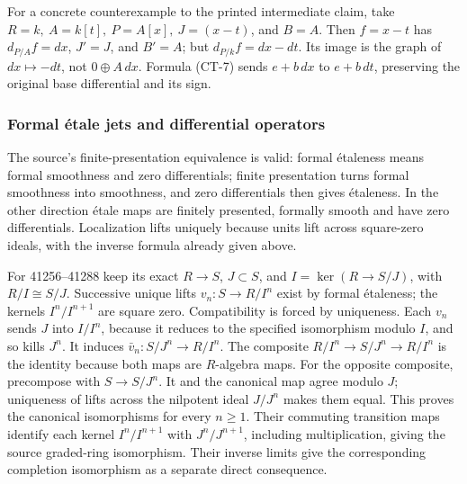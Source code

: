 For a concrete counterexample to the printed intermediate claim, take \(R=k,\ A=k[t],\ P=A[x],\ J=(x-t)\), and \(B=A\). Then \(f=x-t\) has \(d_{P/A}f=dx\), \(J'=J\), and \(B'=A\); but \(d_{P/k}f=dx-dt\). Its image is the graph of \(dx\mapsto-dt\), not \(0\oplus A\,dx\). Formula (CT-7) sends \(e+b\,dx\) to \(e+b\,dt\), preserving the original base differential and its sign.

\subsubsection{Formal étale jets and differential operators}\label{algebra-proof-055-formal-uxe9tale-jets-and-differential-operators}

The source's finite-presentation equivalence is valid: formal étaleness means formal smoothness and zero differentials; finite presentation turns formal smoothness into smoothness, and zero differentials then gives étaleness. In the other direction étale maps are finitely presented, formally smooth and have zero differentials. Localization lifts uniquely because units lift across square-zero ideals, with the inverse formula already given above.

For 41256--41288 keep its exact \(R\to S\), \(J\subset S\), and \(I=\ker(R\to S/J)\), with \(R/I\cong S/J\). Successive unique lifts \(v_n:S\to R/I^n\) exist by formal étaleness; the kernels \(I^n/I^{n+1}\) are square zero. Compatibility is forced by uniqueness. Each \(v_n\) sends \(J\) into \(I/I^n\), because it reduces to the specified isomorphism modulo \(I\), and so kills \(J^n\). It induces \(\bar v_n:S/J^n\to R/I^n\). The composite \(R/I^n\to S/J^n\to R/I^n\) is the identity because both maps are \(R\)-algebra maps. For the opposite composite, precompose with \(S\to S/J^n\). It and the canonical map agree modulo \(J\); uniqueness of lifts across the nilpotent ideal \(J/J^n\) makes them equal. This proves the canonical isomorphisms for every \(n\geq1\). Their commuting transition maps identify each kernel \(I^n/I^{n+1}\) with \(J^n/J^{n+1}\), including multiplication, giving the source graded-ring isomorphism. Their inverse limits give the corresponding completion isomorphism as a separate direct consequence.

